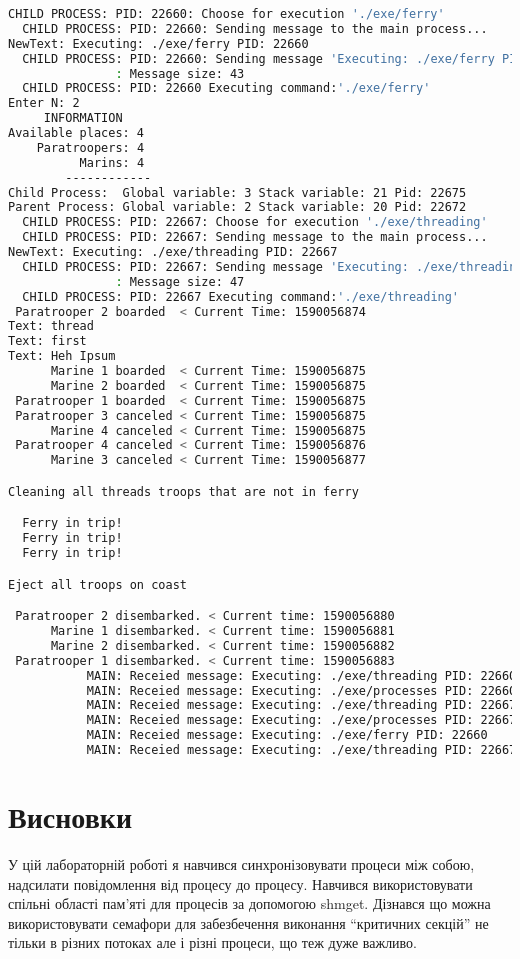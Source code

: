 \documentclass{article}
\begin{document}
\begin{lstlisting}[language=BASH]
  CHILD PROCESS: PID: 22660: Choose for execution './exe/ferry'
  CHILD PROCESS: PID: 22660: Sending message to the main process...
NewText: Executing: ./exe/ferry PID: 22660
  CHILD PROCESS: PID: 22660: Sending message 'Executing: ./exe/ferry PID: 22660' to the MAIN process...
               : Message size: 43
  CHILD PROCESS: PID: 22660 Executing command:'./exe/ferry'
Enter N: 2
     INFORMATION
Available places: 4
    Paratroopers: 4
          Marins: 4
        ------------
Child Process:  Global variable: 3 Stack variable: 21 Pid: 22675
Parent Process: Global variable: 2 Stack variable: 20 Pid: 22672
  CHILD PROCESS: PID: 22667: Choose for execution './exe/threading'
  CHILD PROCESS: PID: 22667: Sending message to the main process...
NewText: Executing: ./exe/threading PID: 22667
  CHILD PROCESS: PID: 22667: Sending message 'Executing: ./exe/threading PID: 22667' to the MAIN process...
               : Message size: 47
  CHILD PROCESS: PID: 22667 Executing command:'./exe/threading'
 Paratrooper 2 boarded  < Current Time: 1590056874 
Text: thread
Text: first
Text: Heh Ipsum
      Marine 1 boarded  < Current Time: 1590056875 
      Marine 2 boarded  < Current Time: 1590056875 
 Paratrooper 1 boarded  < Current Time: 1590056875 
 Paratrooper 3 canceled < Current Time: 1590056875 
      Marine 4 canceled < Current Time: 1590056875 
 Paratrooper 4 canceled < Current Time: 1590056876 
      Marine 3 canceled < Current Time: 1590056877 

Cleaning all threads troops that are not in ferry

  Ferry in trip!
  Ferry in trip!
  Ferry in trip!

Eject all troops on coast

 Paratrooper 2 disembarked. < Current time: 1590056880
      Marine 1 disembarked. < Current time: 1590056881
      Marine 2 disembarked. < Current time: 1590056882
 Paratrooper 1 disembarked. < Current time: 1590056883
           MAIN: Receied message: Executing: ./exe/threading PID: 22660
           MAIN: Receied message: Executing: ./exe/processes PID: 22660
           MAIN: Receied message: Executing: ./exe/threading PID: 22667
           MAIN: Receied message: Executing: ./exe/processes PID: 22667
           MAIN: Receied message: Executing: ./exe/ferry PID: 22660
           MAIN: Receied message: Executing: ./exe/threading PID: 22667

\end{lstlisting}


\newpage
\section{Висновки}
У цій лабораторній роботі я навчився синхронізовувати процеси між собою, надсилати повідомлення від процесу до процесу. Навчився використовувати спільні області пам'яті для процесів за допомогою shmget. Дізнався що можна використовувати семафори для забезбечення виконання ``критичних секцій'' не тільки в різних потоках але і різні процеси, що теж дуже важливо.
\end{document}

